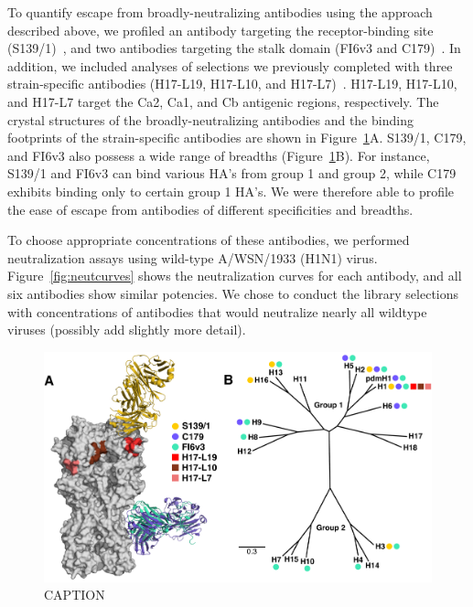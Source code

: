 \documentclass[11pt]{article}
\begin{document}
To quantify escape from broadly-neutralizing antibodies using the approach described above, we profiled an antibody targeting the receptor-binding site (S139/1)~\citep{yoshida2009cross, lee2012heterosubtypic}, and two antibodies targeting the stalk domain (FI6v3 and C179)~\citep{corti2011neutralizing, okuno1993common, dreyfus2013structure}. 
In addition, we included analyses of selections we previously completed with three strain-specific antibodies (H17-L19, H17-L10, and H17-L7)~\citep{doud2017complete}. 
H17-L19, H17-L10, and H17-L7 target the Ca2, Ca1, and Cb antigenic regions, respectively.
The crystal structures of the broadly-neutralizing antibodies and the binding footprints of the strain-specific antibodies are shown in Figure~\ref{fig:antibody_summary}A.
S139/1, C179, and FI6v3 also possess a wide range of breadths (Figure~\ref{fig:antibody_summary}B). 
For instance, S139/1 and FI6v3 can bind various HA's from group 1 and group 2, while C179 exhibits binding only to certain group 1 HA's.
We were therefore able to profile the ease of escape from antibodies of different specificities and breadths.

To choose appropriate concentrations of these antibodies, we performed neutralization assays using wild-type A/WSN/1933 (H1N1) virus. 
Figure~\ref{fig:neutcurves} shows the neutralization curves for each antibody, and all six antibodies show similar potencies.
We chose to conduct the library selections with concentrations of antibodies that would neutralize nearly all wildtype viruses (possibly add slightly more detail).

\begin{figure}
\centerline{\includegraphics[width=\textwidth]{figs/antibody_summary_fig/Ab_summary.pdf}}
\caption{\label{fig:antibody_summary}
CAPTION
}
\end{figure}
\end{document}
